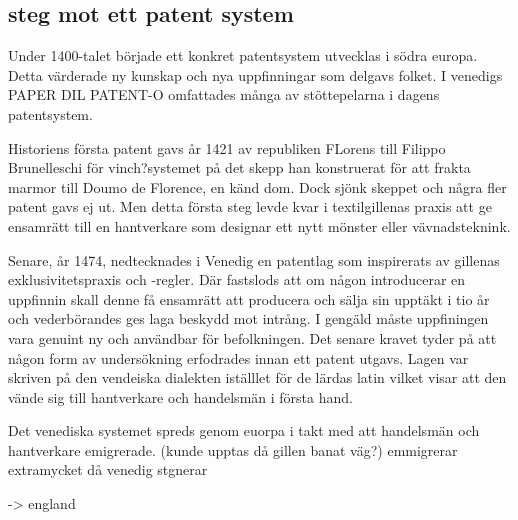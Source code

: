 
\subsection{steg mot ett patent system} %
\label{sub:steg_mot_ett_patent_system}
Under 1400-talet började ett konkret patentsystem utvecklas i södra europa. Detta värderade ny kunskap och nya uppfinningar som delgavs folket. I venedigs PAPER DIL PATENT-O omfattades många av stöttepelarna i dagens patentsystem. 

Historiens första patent gavs år 1421 av republiken FLorens till Filippo Brunelleschi för vinch?systemet på det skepp han konstruerat för att frakta marmor till Doumo de Florence, en känd dom. Dock sjönk skeppet och några fler patent gavs ej ut. Men detta första steg levde kvar i textilgillenas praxis att ge ensamrätt till en hantverkare som designar ett nytt mönster eller vävnadsteknink. 

Senare, år 1474, nedtecknades i Venedig en patentlag som inspirerats av gillenas exklusivitetspraxis och -regler. Där fastslods att om någon introducerar en uppfinnin skall denne få ensamrätt att producera och sälja sin upptäkt i tio år och vederbörandes ges laga beskydd mot intrång. I gengäld måste uppfiningen vara genuint ny och användbar för befolkningen. Det senare kravet tyder på att någon form av undersökning erfodrades innan ett patent utgavs. Lagen var skriven på den vendeiska dialekten iställlet för de lärdas latin vilket visar att den vände sig till hantverkare och handelsmän i första hand.

Det venediska systemet spreds genom euorpa i takt med att handelsmän och hantverkare emigrerade. (kunde upptas då gillen banat väg?) emmigrerar extramycket då venedig stgnerar

-> england




